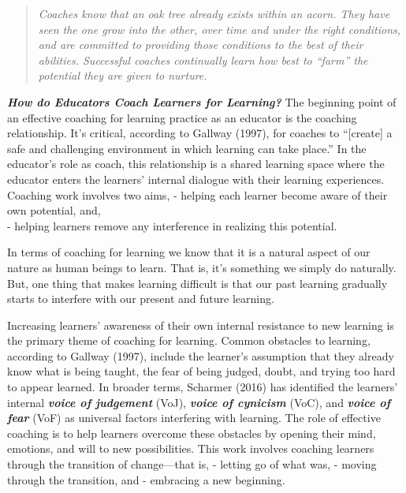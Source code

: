 \documentclass[
]{book}
\begin{document}
\begin{quote}
\emph{Coaches know that an oak tree already exists within an acorn. They have seen the one grow into the other, over time and under the right conditions, and are committed to providing those conditions to the best of their abilities. Successful coaches continually learn how best to ``farm'' the potential they are given to nurture.}
\end{quote}

\textbf{\emph{How do Educators Coach Learners for Learning?}} The beginning point of an effective coaching for learning practice as an educator is the coaching relationship. It's critical, according to Gallway (1997), for coaches to ``{[}create{]} a safe and challenging environment in which learning can take place.'' In the educator's role as coach, this relationship is a shared learning space where the educator enters the learners' internal dialogue with their learning experiences. Coaching work involves two aims,
- helping each learner become aware of their own potential, and,\\
- helping learners remove any interference in realizing this potential.

In terms of coaching for learning we know that it is a natural aspect of our nature as human beings to learn. That is, it's something we simply do naturally. But, one thing that makes learning difficult is that our past learning gradually starts to interfere with our present and future learning.

Increasing learners' awareness of their own internal resistance to new learning is the primary theme of coaching for learning. Common obstacles to learning, according to Gallway (1997), include the learner's assumption that they already know what is being taught, the fear of being judged, doubt, and trying too hard to appear learned. In broader terms, Scharmer (2016) has identified the learners' internal \textbf{\emph{voice of judgement}} (VoJ), \textbf{\emph{voice of cynicism}} (VoC), and \textbf{\emph{voice of fear}} (VoF) as universal factors interfering with learning. The role of effective coaching is to help learners overcome these obstacles by opening their mind, emotions, and will to new possibilities. This work involves coaching learners through the transition of change---that is,
- letting go of what was,
- moving through the transition, and
- embracing a new beginning.
\end{document}
